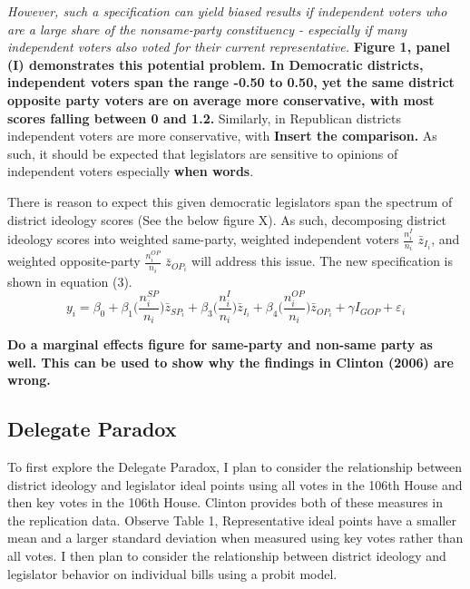 \documentclass[10pt,letterpaper]{article}
\begin{document}
\textit{However, such a specification can yield biased results if independent voters who are a large share of the nonsame-party constituency - especially if many independent voters also voted for their current representative.} \textbf{Figure 1, panel (I) demonstrates this potential problem. In Democratic districts, independent voters span the range -0.50 to 0.50, yet the same district opposite party voters are on average more conservative, with most scores falling between 0 and 1.2.} Similarly, in Republican districts independent voters are more conservative, with \textbf{Insert the comparison.} As such, it should be expected that legislators are sensitive to opinions of independent voters especially \textbf{when words}.

There is reason to expect this given democratic legislators span the spectrum of district ideology scores (See the below figure X). As such, decomposing district ideology scores into weighted same-party, weighted independent voters $\frac{n_i^{I}}{n_i}$ $\bar{z}_{I_i}$, and weighted opposite-party $\frac{n_i^{OP}}{n_i}$ $\bar{z}_{OP_i}$ will address this issue. The new specification is shown in equation (3).
\begin{equation}
y_i  = \beta_0 + \beta_1 \bigg( \frac{n_i^{SP}}{n_i} \bigg) \bar{z}_{SP_i} + \beta_3 \bigg( \frac{n_i^{I}}{n_i} \bigg) \bar{z}_{I_i} + \beta_4 \bigg( \frac{n_i^{OP}}{n_i} \bigg) \bar{z}_{OP_i} + \gamma I_{GOP} + \varepsilon_i
\end{equation}

\textbf{Do a marginal effects figure for same-party and non-same party as well. This can be used to show why the findings in Clinton (2006) are wrong.}

\newpage

\newpage

\newpage

\newpage




 

\newpage

\subsection{Delegate Paradox}


To first explore the Delegate Paradox, I plan to consider the relationship between district ideology and legislator ideal points using all votes in the 106th House and then key votes in the 106th House. Clinton provides both of these measures in the replication data. Observe Table 1, Representative ideal points have a smaller mean and a larger standard deviation when measured using key votes rather than all votes. I then plan to consider the relationship between district ideology and legislator behavior on individual bills using a probit model.
\end{document}
